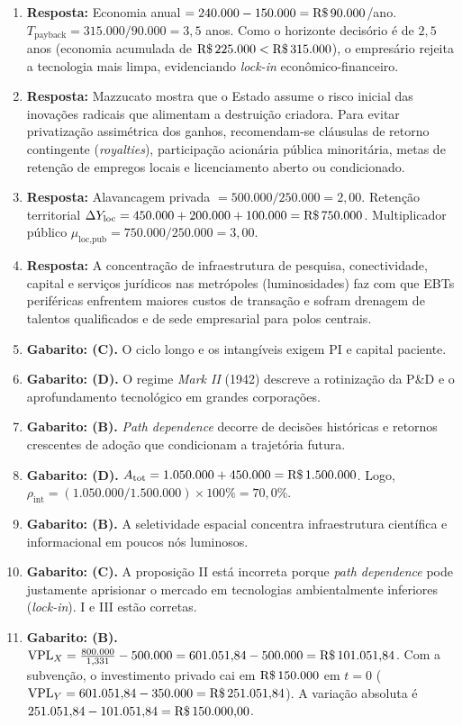 \begin{boxGabarito}
\begin{enumerate}[leftmargin=1.6em, itemsep=4pt]
  \item \textbf{Resposta:} Economia anual $= 240.000 - 150.000 = \text{R\$\,}{90.000}$/ano. $T_{\text{payback}} = 315.000 / 90.000 = 3{,}5$ anos. Como o horizonte decisório é de $2{,}5$ anos (economia acumulada de $\text{R\$\,}{225.000} < \text{R\$\,}{315.000}$), o empresário rejeita a tecnologia mais limpa, evidenciando \textit{lock-in} econômico-financeiro.
  \item \textbf{Resposta:} Mazzucato mostra que o Estado assume o risco inicial das inovações radicais que alimentam a destruição criadora. Para evitar privatização assimétrica dos ganhos, recomendam-se cláusulas de retorno contingente (\textit{royalties}), participação acionária pública minoritária, metas de retenção de empregos locais e licenciamento aberto ou condicionado.
  \item \textbf{Resposta:} Alavancagem privada $= 500.000 / 250.000 = 2{,}00$. Retenção territorial $\Delta Y_{\text{loc}} = 450.000 + 200.000 + 100.000 = \text{R\$\,}{750.000}$. Multiplicador público $\mu_{\text{loc,pub}} = 750.000 / 250.000 = 3{,}00$.
  \item \textbf{Resposta:} A concentração de infraestrutura de pesquisa, conectividade, capital e serviços jurídicos nas metrópoles (luminosidades) faz com que EBTs periféricas enfrentem maiores custos de transação e sofram drenagem de talentos qualificados e de sede empresarial para polos centrais.
  \item \textbf{Gabarito: (C).} O ciclo longo e os intangíveis exigem PI e capital paciente.
  \item \textbf{Gabarito: (D).} O regime \textit{Mark II} (1942) descreve a rotinização da P\&D e o aprofundamento tecnológico em grandes corporações.
  \item \textbf{Gabarito: (B).} \textit{Path dependence} decorre de decisões históricas e retornos crescentes de adoção que condicionam a trajetória futura.
  \item \textbf{Gabarito: (D).} $A_{\text{tot}} = 1.050.000 + 450.000 = \text{R\$\,}{1.500.000}$. Logo, $\rho_{\text{int}} = (1.050.000 / 1.500.000) \times 100\% = 70{,}0\%$.
  \item \textbf{Gabarito: (B).} A seletividade espacial concentra infraestrutura científica e informacional em poucos nós luminosos.
  \item \textbf{Gabarito: (C).} A proposição II está incorreta porque \textit{path dependence} pode justamente aprisionar o mercado em tecnologias ambientalmente inferiores (\textit{lock-in}). I e III estão corretas.
  \item \textbf{Gabarito: (B).} $\text{VPL}_X = \frac{800.000}{1{,}331} - 500.000 = 601.051{,}84 - 500.000 = \text{R\$\,}{101.051{,}84}$. Com a subvenção, o investimento privado cai em $\text{R\$\,}{150.000}$ em $t=0$ ($\text{VPL}_Y = 601.051{,}84 - 350.000 = \text{R\$\,}{251.051{,}84}$). A variação absoluta é $251.051{,}84 - 101.051{,}84 = \text{R\$\,}{150.000{,}00}$.

\end{enumerate}
\end{boxGabarito}

